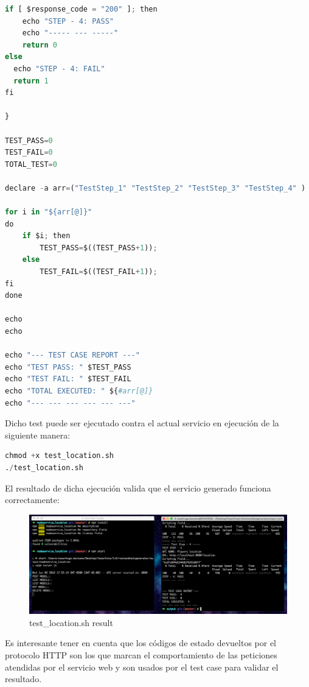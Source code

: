 \documentclass[a4paper,11pt]{book}
\begin{document}
\begin{lstlisting}[language=python,caption={  test\_location.sh }]
if [ $response_code = "200" ]; then
    echo "STEP - 4: PASS"
    echo "----- --- -----"
    return 0
else
  echo "STEP - 4: FAIL"
  return 1
fi

}

TEST_PASS=0
TEST_FAIL=0
TOTAL_TEST=0

declare -a arr=("TestStep_1" "TestStep_2" "TestStep_3" "TestStep_4" )

for i in "${arr[@]}"
do
    if $i; then
        TEST_PASS=$((TEST_PASS+1));
    else
        TEST_FAIL=$((TEST_FAIL+1));
fi
done

echo
echo

echo "--- TEST CASE REPORT ---"
echo "TEST PASS: " $TEST_PASS
echo "TEST FAIL: " $TEST_FAIL
echo "TOTAL EXECUTED: " ${#arr[@]}
echo "--- --- --- --- --- ---"
\end{lstlisting} 

Dicho test puede ser ejecutado contra el actual servicio en ejecución de la siguiente manera:


\begin{lstlisting}[language=python,caption={  exec test\_location.sh }]
chmod +x test_location.sh
./test_location.sh
\end{lstlisting} 

El resultado de dicha ejecución valida que el servicio generado funciona correctamente:


\begin{figure}[H]  
\centering 
\includegraphics[scale=0.25]{imagenes/t24.png}
\caption{ test\_location.sh result}  
\end{figure}

Es interesante tener en cuenta que los códigos de estado devueltos por el protocolo HTTP son los que marcan el comportamiento de las peticiones atendidas por el servicio web y son usados por el test case para validar el resultado. 
\end{document}
